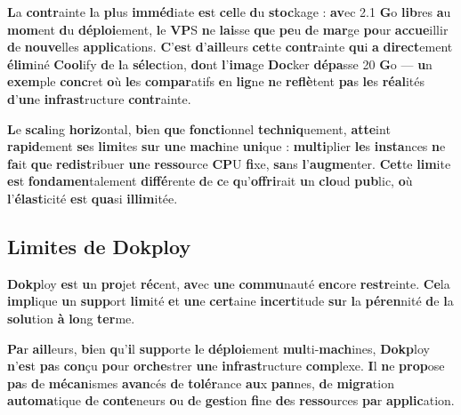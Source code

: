 \documentclass{rapportClass} %
\begin{document}
\textbf{L}a \textbf{contr}ainte \textbf{l}a \textbf{pl}us \textbf{imméd}iate \textbf{es}t \textbf{cel}le \textbf{d}u \textbf{stoc}kage : \textbf{av}ec 2.1 \textbf{G}o
\textbf{lib}res \textbf{a}u \textbf{mom}ent \textbf{d}u \textbf{déploi}ement, \textbf{l}e \textbf{VP}S \textbf{n}e \textbf{lai}sse \textbf{qu}e \textbf{pe}u \textbf{d}e \textbf{mar}ge
\textbf{po}ur \textbf{accue}illir \textbf{d}e \textbf{nouve}lles \textbf{applic}ations. \textbf{C}'\textbf{es}t \textbf{d}'\textbf{aill}eurs \textbf{cet}te
\textbf{contr}ainte \textbf{qu}i \textbf{a} \textbf{direct}ement \textbf{élim}iné \textbf{Cool}ify \textbf{d}e \textbf{l}a \textbf{sélec}tion, \textbf{do}nt
\textbf{l}'\textbf{ima}ge \textbf{Doc}ker \textbf{dépa}sse 20 \textbf{G}o — \textbf{u}n \textbf{exem}ple \textbf{conc}ret \textbf{o}ù \textbf{le}s \textbf{compar}atifs
\textbf{e}n \textbf{lig}ne \textbf{n}e \textbf{reflè}tent \textbf{pa}s \textbf{le}s \textbf{réal}ités \textbf{d}'\textbf{un}e \textbf{infrast}ructure \textbf{contr}ainte.

\textbf{L}e \textbf{scal}ing \textbf{horiz}ontal, \textbf{bi}en \textbf{qu}e \textbf{foncti}onnel \textbf{techniq}uement, \textbf{atte}int
\textbf{rapid}ement \textbf{se}s \textbf{limi}tes \textbf{su}r \textbf{un}e \textbf{mach}ine \textbf{uni}que : \textbf{multi}plier \textbf{le}s
\textbf{insta}nces \textbf{n}e \textbf{fa}it \textbf{qu}e \textbf{redist}ribuer \textbf{un}e \textbf{resso}urce \textbf{CP}U \textbf{fi}xe, \textbf{sa}ns
\textbf{l}'\textbf{augme}nter. \textbf{Cet}te \textbf{lim}ite \textbf{es}t \textbf{fondamen}talement \textbf{diffé}rente \textbf{d}e \textbf{c}e
\textbf{q}u'\textbf{offri}rait \textbf{u}n \textbf{clo}ud \textbf{pub}lic, \textbf{o}ù \textbf{l}'\textbf{élast}icité \textbf{es}t \textbf{qua}si \textbf{illim}itée.

\subsection{Limites de Dokploy}

\textbf{Dokp}loy \textbf{es}t \textbf{u}n \textbf{pro}jet \textbf{réc}ent, \textbf{av}ec \textbf{un}e \textbf{commu}nauté \textbf{enc}ore \textbf{restr}einte.
\textbf{Ce}la \textbf{impl}ique \textbf{u}n \textbf{supp}ort \textbf{lim}ité \textbf{e}t \textbf{un}e \textbf{cert}aine \textbf{incert}itude \textbf{su}r \textbf{l}a
\textbf{péren}nité \textbf{d}e \textbf{l}a \textbf{solu}tion \textbf{à} \textbf{lo}ng \textbf{ter}me.

\textbf{Pa}r \textbf{aill}eurs, \textbf{bi}en \textbf{q}u'\textbf{i}l \textbf{supp}orte \textbf{l}e \textbf{déploi}ement \textbf{mul}ti-\textbf{mach}ines,
\textbf{Dokp}loy \textbf{n}'\textbf{es}t \textbf{pa}s \textbf{con}çu \textbf{po}ur \textbf{orche}strer \textbf{un}e \textbf{infrast}ructure \textbf{comp}lexe.
\textbf{I}l \textbf{n}e \textbf{prop}ose \textbf{pa}s \textbf{d}e \textbf{mécan}ismes \textbf{avan}cés \textbf{d}e \textbf{tolér}ance \textbf{au}x \textbf{pan}nes, \textbf{d}e
\textbf{migra}tion \textbf{automa}tique \textbf{d}e \textbf{conte}neurs \textbf{o}u \textbf{d}e \textbf{gest}ion \textbf{fi}ne \textbf{de}s \textbf{resso}urces
\textbf{pa}r \textbf{applic}ation.
\end{document}
